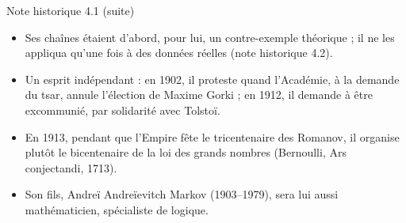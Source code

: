 \begin{frame}{Note historique 4.1 (suite)}
  \small
  \begin{itemize}
    \item Ses chaînes étaient d'abord, pour lui, un contre-exemple
      théorique ; il ne les appliqua qu'une fois à des données réelles
      (note historique 4.2).
    \item Un esprit indépendant : en 1902, il proteste quand l'Académie,
      à la demande du tsar, annule l'élection de Maxime Gorki ; en 1912,
      il demande à être excommunié, par solidarité avec Tolstoï.
    \item En 1913, pendant que l'Empire fête le tricentenaire des
      Romanov, il organise plutôt le bicentenaire de la loi des grands
      nombres (Bernoulli, Ars conjectandi, 1713).
    \item Son fils, Andreï Andreïevitch Markov (1903--1979), sera lui
      aussi mathématicien, spécialiste de logique.
  \end{itemize}
\end{frame}
